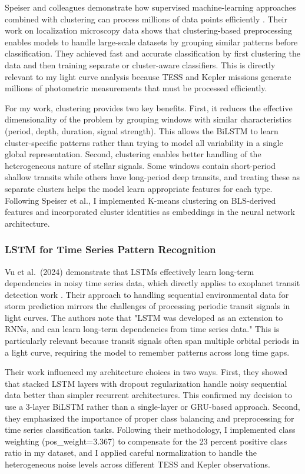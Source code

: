 \documentclass[letterpaper]{article} %
\begin{document}
Speiser and colleagues demonstrate how supervised machine-learning approaches combined with clustering can process millions of data points efficiently \cite{Speiser2020clustering}. Their work on localization microscopy data shows that clustering-based preprocessing enables models to handle large-scale datasets by grouping similar patterns before classification. They achieved fast and accurate classification by first clustering the data and then training separate or cluster-aware classifiers. This is directly relevant to my light curve analysis because TESS and Kepler missions generate millions of photometric measurements that must be processed efficiently.

For my work, clustering provides two key benefits. First, it reduces the effective dimensionality of the problem by grouping windows with similar characteristics (period, depth, duration, signal strength). This allows the BiLSTM to learn cluster-specific patterns rather than trying to model all variability in a single global representation. Second, clustering enables better handling of the heterogeneous nature of stellar signals. Some windows contain short-period shallow transits while others have long-period deep transits, and treating these as separate clusters helps the model learn appropriate features for each type. Following Speiser et al., I implemented K-means clustering on BLS-derived features and incorporated cluster identities as embeddings in the neural network architecture.

\subsubsection{LSTM for Time Series Pattern Recognition}

Vu et al.\ (2024) demonstrate that LSTMs effectively learn long-term dependencies in noisy time series data, which directly applies to exoplanet transit detection work \cite{Vu2024LSTM}. Their approach to handling sequential environmental data for storm prediction mirrors the challenges of processing periodic transit signals in light curves. The authors note that "LSTM was developed as an extension to RNNs, and can learn long-term dependencies from time series data." This is particularly relevant because transit signals often span multiple orbital periods in a light curve, requiring the model to remember patterns across long time gaps.

Their work influenced my architecture choices in two ways. First, they showed that stacked LSTM layers with dropout regularization handle noisy sequential data better than simpler recurrent architectures. This confirmed my decision to use a 3-layer BiLSTM rather than a single-layer or GRU-based approach. Second, they emphasized the importance of proper class balancing and preprocessing for time series classification tasks. Following their methodology, I implemented class weighting (pos\_weight=3.367) to compensate for the 23 percent positive class ratio in my dataset, and I applied careful normalization to handle the heterogeneous noise levels across different TESS and Kepler observations.
\end{document}
